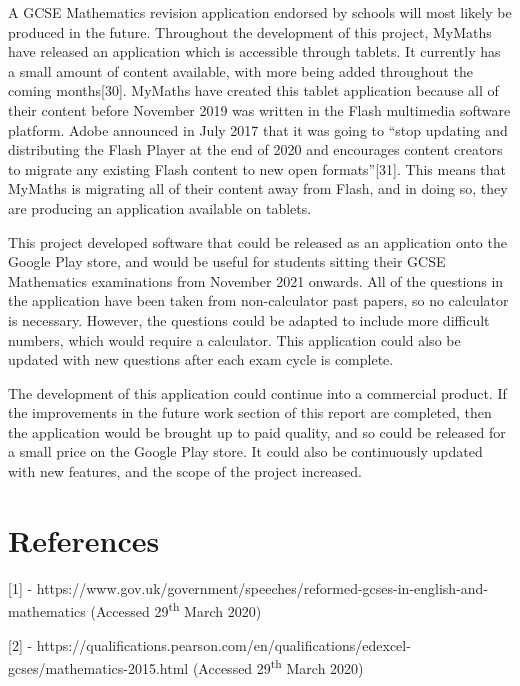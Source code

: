 \documentclass{article}
\begin{document}
A GCSE Mathematics revision application endorsed by schools will most likely be produced in the future. Throughout the development of this project, MyMaths have released an application which is accessible through tablets. It currently has a small amount of content available, with more being added throughout the coming months[30]. MyMaths have created this tablet application because all of their content before November 2019 was written in the Flash multimedia software platform. Adobe announced in July 2017 that it was going to ``stop updating and distributing the Flash Player at the end of 2020 and encourages content creators to migrate any existing Flash content to new open formats''[31]. This means that MyMaths is migrating all of their content away from Flash, and in doing so, they are producing an application available on tablets. \par

This project developed software that could be released as an application onto the Google Play store, and would be useful for students sitting their GCSE Mathematics examinations from November 2021 onwards. All of the questions in the application have been taken from non-calculator past papers, so no calculator is necessary. However, the questions could be adapted to include more difficult numbers, which would require a calculator. This application could also be updated with new questions after each exam cycle is complete. \par

The development of this application could continue into a commercial product. If the improvements in the future work section of this report are completed, then the application would be brought up to paid quality, and so could be released for a small price on the Google Play store. It could also be continuously updated with new features, and the scope of the project increased. \par

\section{References}
\label{section:references}

[1] - https://www.gov.uk/government/speeches/reformed-gcses-in-english-and-mathematics (Accessed 29\textsuperscript{th} March 2020) \par

[2] - https://qualifications.pearson.com/en/qualifications/edexcel-gcses/mathematics-2015.html (Accessed 29\textsuperscript{th} March 2020) \par
\end{document}
